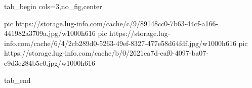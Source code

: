  
 
 
 
 


\ifcmt
  tab_begin cols=3,no_fig,center

     pic https://storage.lug-info.com/cache/c/9/89148cc0-7b63-44cf-a166-441982a3709a.jpg/w1000h616%
		 pic https://storage.lug-info.com/cache/6/4/2cb289d0-5263-49ef-8327-477e58d64fdf.jpg/w1000h616%
		 pic https://storage.lug-info.com/cache/b/0/2621ea7d-eaf0-4097-ba07-e9d3e284b5e0.jpg/w1000h616%

  tab_end
\fi
